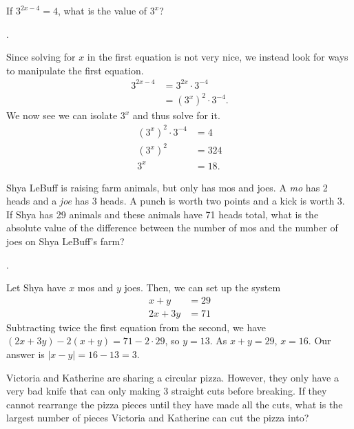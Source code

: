 \documentclass[11pt]{article}
\begin{document}
\begin{problem}If $3^{2x-4} = 4$, what is the value of $3^{x}$?
\end{problem}
\begin{answer}
.
\end{answer}
\begin{solution}
Since solving for $x$ in the first equation is not very nice, we instead look for ways to manipulate the first equation.
\begin{align*}
3^{2x-4} &= 3^{2x} \cdot 3^{-4} \\
&= (3^x)^2 \cdot 3^{-4}.
\end{align*}
We now see we can isolate  $3^{x}$ and thus solve for it.
\begin{align*}
(3^x)^2 \cdot 3^{-4} &= 4 \\
(3^x)^2 &= 324 \\
3^x &= \boxed{18}.
\end{align*}
\end{solution}



\begin{problem}  Shya LeBuff is raising farm animals, but only has mos and joes. A \emph{mo} has 2 heads and a \emph{joe} has 3 heads. A punch is worth two points and a kick is worth 3. If Shya has 29 animals and these animals have 71 heads total, what is the absolute value of the difference between the number of mos and the number of joes on Shya LeBuff's farm?
\end{problem}

\begin{answer} . \end{answer}
\begin{solution}
Let Shya have $x$ mos and $y$ joes. Then, we can set up the system
\begin{align*}
x + y &= 29 \\
2x + 3y &= 71
\end{align*}
Subtracting twice the first equation from the second, we have $(2x + 3y) - 2(x + y) = 71 - 2 \cdot 29$, so $y = 13$. As $x + y = 29$, $x = 16$. Our answer is $\left| x - y \right| = 16 - 13 = \boxed{3}$.
\end{solution}

\begin{problem} Victoria and Katherine are sharing a circular pizza. However, they only have a very bad knife that can only making 3 straight cuts before breaking. If they cannot rearrange the pizza pieces until they have made all the cuts, what is the largest number of pieces Victoria and Katherine can cut the pizza into?
\end{problem}
\end{document}
